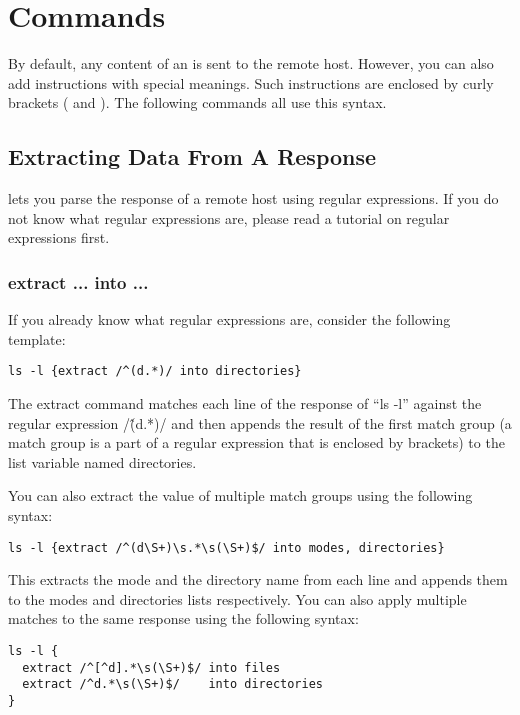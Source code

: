 \section{\product Commands}

By default, any content of an \product is sent to the remote host. However, 
you can also add instructions with special meanings. Such instructions are 
enclosed by curly brackets ({ and }). The following commands all use this 
syntax. 

\subsection{Extracting Data From A Response}

\product lets you parse the response of a remote host using regular 
expressions. If you do not know what regular expressions are, please read 
a tutorial on regular expressions first.

\subsubsection{extract ... into ...}

If you already know what regular expressions are, consider the following 
template: 

\begin{lstlisting}
ls -l {extract /^(d.*)/ into directories}
\end{lstlisting}

The extract command matches each line of the response of ``ls -l'' against 
the regular expression /\^(d.*)/ and then appends the result of the first 
match group (a match group is a part of a regular expression that is 
enclosed by brackets) to the list variable named directories. 

You can also extract the value of multiple match groups using the following 
syntax: 

\begin{lstlisting}
ls -l {extract /^(d\S+)\s.*\s(\S+)$/ into modes, directories}
\end{lstlisting}

This extracts the mode and the directory name from each line and appends 
them to the modes and directories lists respectively. You can also apply 
multiple matches to the same response using the following syntax: 

\begin{lstlisting}
ls -l {
  extract /^[^d].*\s(\S+)$/ into files
  extract /^d.*\s(\S+)$/    into directories
}
\end{lstlisting}

